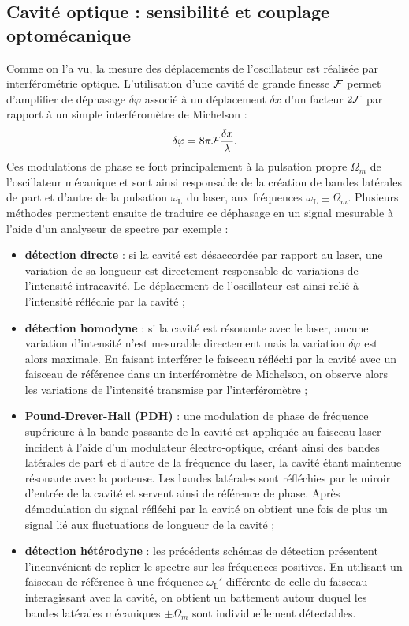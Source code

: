 \documentclass[12pt,a4paper]{article}
\begin{document}
\subsection{Cavité optique : sensibilité et couplage optomécanique}

Comme on l'a vu, la mesure des déplacements de l'oscillateur est réalisée par interférométrie optique.
L'utilisation d'une cavité de grande finesse $\cal{F}$ permet d'amplifier de déphasage $\delta\varphi$ associé à un déplacement $\delta x$ d'un facteur $2\cal{F}$ par rapport à un simple interféromètre de Michelson :
\begin{equation}
\delta \varphi = 8\pi{\cal{F}}\frac{\delta x}{\lambda}.
\end{equation}
Ces modulations de phase se font principalement à la pulsation propre $\Omega_m$ de l'oscillateur mécanique et sont ainsi responsable de la création de bandes latérales de part et d'autre de la pulsation $\omega_\mathrm{L}$ du laser, aux fréquences $\omega_\mathrm{L} \pm \Omega_m$.
Plusieurs méthodes permettent ensuite de traduire ce déphasage en un signal mesurable à l'aide d'un analyseur de spectre par exemple :
\begin{itemize}
\item \textbf{détection directe} : si la cavité est désaccordée par rapport au laser, une variation de sa longueur est directement responsable de variations de l'intensité intracavité.
Le déplacement de l'oscillateur est ainsi relié à l'intensité réfléchie par la cavité ;
\item \textbf{détection homodyne} : si la cavité est résonante avec le laser, aucune variation d'intensité n'est mesurable directement mais la variation $\delta \varphi$ est alors maximale.
En faisant interférer le faisceau réfléchi par la cavité avec un faisceau de référence dans un interféromètre de Michelson, on observe alors les variations de l'intensité transmise par l'interféromètre ;
\item \textbf{Pound-Drever-Hall (PDH)} : une modulation de phase de fréquence supérieure à la bande passante de la cavité est appliquée au faisceau laser incident à l'aide d'un modulateur électro-optique, créant ainsi des bandes latérales de part et d'autre de la fréquence du laser, la cavité étant maintenue résonante avec la porteuse.
Les bandes latérales sont réfléchies par le miroir d'entrée de la cavité et servent ainsi de référence de phase.
Après démodulation du signal réfléchi par la cavité on obtient une fois de plus un signal lié aux fluctuations de longueur de la cavité ;
\item \textbf{détection hétérodyne} : les précédents schémas de détection présentent l'inconvénient de replier le spectre sur les fréquences positives.
En utilisant un faisceau de référence à une fréquence $\omega_\mathrm{L}'$ différente de celle du faisceau interagissant avec la cavité, on obtient un battement autour duquel les bandes latérales mécaniques $\pm \Omega_m$ sont individuellement détectables. 
\end{itemize}
\end{document}
